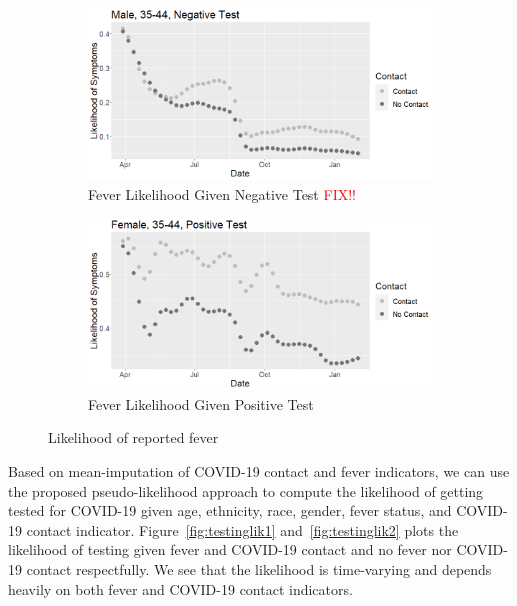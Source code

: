 \documentclass[11pt]{amsart}
\numberwithin{equation}{section}
\theoremstyle{plain}
\begin{document}
\begin{figure}[!th]
\centering
\begin{subfigure}{.5\textwidth}
 \centering
 \includegraphics[width=.9\linewidth]{../figs/tvprop_symptom_fig1.png}
 \caption{Fever Likelihood Given Negative Test \textcolor{red}{FIX!!}}
 \label{fig:symptomlik1}
\end{subfigure}%
\begin{subfigure}{.5\textwidth}
 \centering
\includegraphics[width=.9\linewidth]{../figs/tvprop_symptom_fig2.png}
 \caption{Fever Likelihood Given Positive Test}
 \label{fig:symptomlik2}
\end{subfigure}
\caption{Likelihood of reported fever}
\label{fig:symptomlik}
\end{figure}

Based on mean-imputation of COVID-19 contact and fever indicators, we can use the proposed pseudo-likelihood approach to compute the likelihood of getting tested for COVID-19 given age, ethnicity, race, gender, fever status, and COVID-19 contact indicator.  Figure~\ref{fig:testinglik1} and~\ref{fig:testinglik2} plots the likelihood of testing given fever and COVID-19 contact and no fever nor COVID-19 contact respectfully.  We see that the likelihood is time-varying and depends heavily on both fever and COVID-19 contact indicators.
\end{document}
